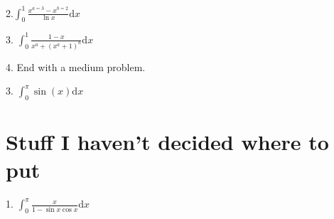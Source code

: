 \documentclass{article}
\newcommand{\dd}{\mathrm{d}}
\begin{document}
2.$\int_0^1 \frac{x^{a=3}-x^{b=2}}{\ln{x}} \dd x$ \newline  \newline \newline   

3. $\int_0^1 \frac{1-x}{x^a+(x^a+1)^a} \dd x$


4. End with a medium problem.




3. $\int_0^{\pi} \sin(x) \dd x$ \newline  \newline \newline  %


















\section{Stuff I haven't decided where to put}

1. $\int_0^{\pi} \frac{x}{1-\sin{x}\cos{x}} \dd x$
\end{document}
